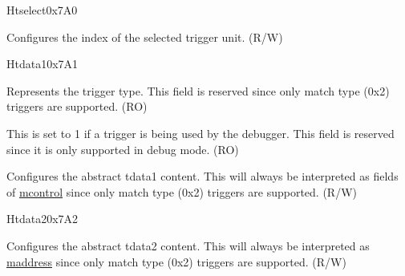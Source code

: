 \begin{register}{H}{tselect}{0x7A0}\label{regdesc:LPTSELECT}
%
\regnewline%
\begin{regdesc}\begin{reglist}
\label{fielddesc:LPTSELECT}\item [tselect] Configures the index of the selected trigger unit. (R/W)
\end{reglist}\end{regdesc}
\end{register}

\begin{register}{H}{tdata1}{0x7A1}\label{regdesc:LPTDATA1}
%
%
%
\regnewline%
\begin{regdesc}\begin{reglist}
\label{fielddesc:LPTDATA1TYPE}\item [type] Represents the trigger type. This field is reserved since only match type (0x2) triggers are supported. (RO)
\label{fielddesc:LPTDATA1DMODE}\item [dmode] This is set to 1 if a trigger is being used by the debugger. This field is reserved since it is only supported in debug mode. (RO)
\label{fielddesc:LPTDATA1DATA}\item [data] Configures the abstract tdata1 content. This will always be interpreted as fields of \hyperref[regdesc:LPMCONTROL]{mcontrol} since only match type (0x2) triggers are supported. (R/W)
\end{reglist}\end{regdesc}
\end{register}


\begin{register}{H}{tdata2}{0x7A2}\label{regdesc:LPTDATA2}
%
\regnewline%
\begin{regdesc}\begin{reglist}
\label{fielddesc:LPTDATA2}\item [tdata2] Configures the abstract tdata2 content. This will always be interpreted as \hyperref[regdesc:LPMADDRESS]{maddress} since only match type (0x2) triggers are supported. (R/W)
\end{reglist}\end{regdesc}
\end{register}


